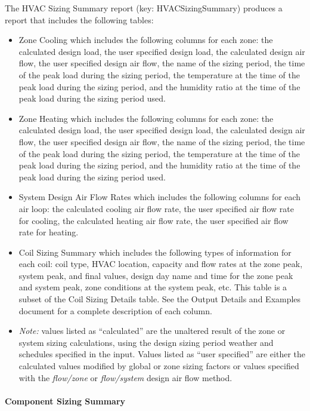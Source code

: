 The HVAC Sizing Summary report (key: HVACSizingSummary) produces a report that includes the following tables:

\begin{itemize}
\item
  Zone Cooling which includes the following columns for each zone: the calculated design load, the user specified design load, the calculated design air flow, the user specified design air flow, the name of the sizing period, the time of the peak load during the sizing period, the temperature at the time of the peak load during the sizing period, and the humidity ratio at the time of the peak load during the sizing period used.
\item
  Zone Heating which includes the following columns for each zone: the calculated design load, the user specified design load, the calculated design air flow, the user specified design air flow, the name of the sizing period, the time of the peak load during the sizing period, the temperature at the time of the peak load during the sizing period, and the humidity ratio at the time of the peak load during the sizing period used.
\item
  System Design Air Flow Rates which includes the following columns for each air loop: the calculated cooling air flow rate, the user specified air flow rate for cooling, the calculated heating air flow rate, the user specified air flow rate for heating.
\item
  Coil Sizing Summary which includes the following types of information for each coil: coil type, HVAC location, capacity and flow rates at the zone peak, system peak, and final values, design day name and time for the zone peak and system peak, zone conditions at the system peak, etc. This table is a subset of the Coil Sizing Details table. See the Output Details and Examples document for a complete description of each column.
\item
  \emph{Note:} values listed as ``calculated'' are the unaltered result of the zone or system sizing calculations, using the design sizing period weather and schedules specified in the input. Values listed as ``user specified'' are either the calculated values modified by global or zone sizing factors or values specified with the \emph{flow/zone} or \emph{flow/system} design air flow method.
\end{itemize}

\paragraph{Component Sizing Summary}\label{component-sizing-summary}

